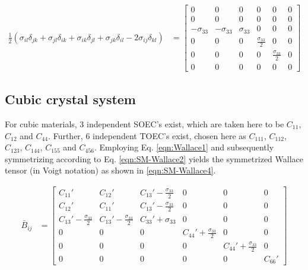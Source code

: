 \documentclass[showpacs,aps,floatfix,prb,reprint,superscriptaddress,onecolumn]{revtex4-1}
\begin{document}
\begin{equation}
\label{eqn:SM-Wallace3}
  \begin{aligned}
        \frac{1}{2} \left(\sigma_{il} \delta_{jk} + \sigma_{jl} \delta_{ik} + \sigma_{ik} \delta_{jl} + \sigma_{jk} \delta_{il} - 2\sigma_{ij} \delta_{kl} \right)&=\begin{bmatrix} 0 & 0 & 0 & 0 & 0 & 0 \\ 0 & 0 & 0 & 0 & 0 & 0 \\ -\sigma_{33} & -\sigma_{33} & \sigma_{33} & 0 & 0 & 0 \\ 0 & 0 & 0 & \frac{\sigma_{33}}{2} & 0 & 0 \\ 0 & 0 & 0 & 0 & \frac{\sigma_{33}}{2} & 0 \\ 0 & 0 & 0 & 0 & 0 & 0 \end{bmatrix}
       \end{aligned}
\end{equation} 

\subsection{Cubic crystal system}
For cubic materials, 3 independent SOEC's exist, which are taken here to be $C_{11}$, $C_{12}$ and $C_{44}$. Further, 6 independent TOEC's exist, chosen here as $C_{111}$, $C_{112}$, $C_{123}$, $C_{144}$, $C_{155}$ and $C_{456}$. Employing Eq. \ref{eqn:Wallace1} and subsequently symmetrizing according to Eq. \ref{eqn:SM-Wallace2} yields the symmetrized Wallace tensor (in Voigt notation) as shown in \ref{eqn:SM-Wallace4}.

\begin{equation}
\label{eqn:SM-Wallace4}
  \begin{aligned}
        \bar{B}_{ij}&=\begin{bmatrix} C_{11}' & C_{12}' & C_{13}'-\frac{\sigma_{33}}{2} & 0 & 0 & 0 \\ C_{12}' & C_{11}' & C_{13}'-\frac{\sigma_{33}}{2} & 0 & 0 & 0 \\ C_{13}'-\frac{\sigma_{33}}{2} & C_{13}'-\frac{\sigma_{33}}{2} & C_{33}'+\sigma_{33} & 0 & 0 & 0 \\ 0 & 0 & 0 & C_{44}'+\frac{\sigma_{33}}{2} & 0 & 0 \\ 0 & 0 & 0 & 0 & C_{44}'+\frac{\sigma_{33}}{2} & 0 \\ 0 & 0 & 0 & 0 & 0 & C_{66}' \end{bmatrix}
       \end{aligned}
\end{equation} 
\end{document}
